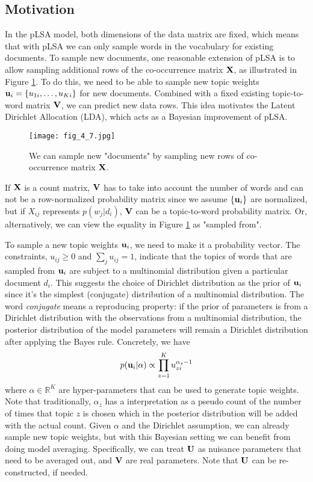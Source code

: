 \documentclass[../main.tex]{subfiles}
\begin{document}
\subsection{Motivation}
In the pLSA model, both dimensions of the data matrix are fixed, which means that with pLSA we can only sample words in the vocabulary for existing documents. To sample new documents, one reasonable extension of pLSA is to allow sampling additional rows of the co-occurrence matrix ${\bf X}$, as illustrated in Figure \ref{fig_4_7}. To do this, we need to be able to sample new topic weights ${\bf u}_i=\{u_{1i},\dots,u_{Ki}\}$ for new documents. Combined with a fixed existing topic-to-word matrix ${\bf V}$, we can predict new data rows. This idea motivates the Latent Dirichlet Allocation (LDA), which acts as a Bayesian improvement of pLSA. 
\begin{figure}[h] 
	\centering 
	\texttt{[image: fig\_4\_7.jpg]} 
	\caption{We can sample new "documents" by sampling new rows of co-occurrence matrix ${\bf X}$.}\label{fig_4_7}
\end{figure}
\begin{remark}
	If ${\bf X}$ is a count matrix, ${\bf V}$ has to take into account the number of words and can not be a row-normalized probability matrix since we assume $\{{\bf u}_i\}$ are normalized, but if $X_{ij}$ represents $p(w_j|d_i)$, ${\bf V}$ can be a topic-to-word probability matrix. Or, alternatively, we can view the equality in Figure \ref{fig_4_7} as "sampled from".
\end{remark}
\par To sample a new topic weights ${\bf u}_i$, we need to make it a probability vector. The constraints, $u_{ij}\geq 0$ and $\sum_j u_{ij}=1$, indicate that the topics of words that are sampled from ${\bf u}_i$ are subject to a multinomial distribution given a particular document $d_i$. This suggests the choice of Dirichlet distribution as the prior of ${\bf u}_i$ since it's the simplest (conjugate) distribution of a multinomial distribution. The word \emph{conjugate} means a reproducing property: if the prior of parameters is from a Dirichlet distribution with the observations from a multinomial distribution, the posterior distribution of the model parameters will remain a Dirichlet distribution after applying the Bayes rule. Concretely, we have
\begin{equation*}
p({\bf u}_i|\alpha)\propto\prod_{z=1}^{K}u_{zi}^{\alpha_z-1}
\end{equation*}
where $\alpha\in \mathbb{R}^K$ are hyper-parameters that can be used to generate topic weights. Note that traditionally, $\alpha_z$ has a interpretation as a pseudo count of the number of times that topic $z$ is chosen which in the posterior distribution will be added with the actual count. Given $\alpha$ and the Dirichlet assumption, we can already sample new topic weights, but with this Bayesian setting we can benefit from doing model averaging. Specifically, we can treat ${\bf U}$ as nuisance parameters that need to be averaged out, and ${\bf V}$ are real parameters. Note that ${\bf U}$ can be re-constructed, if needed.
\end{document}
